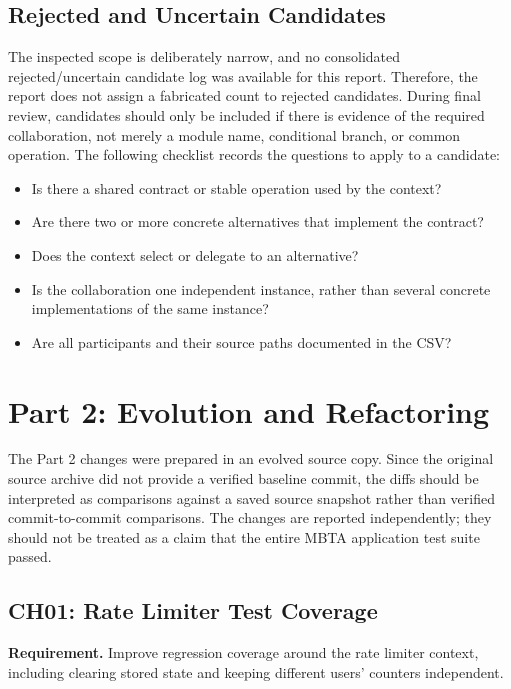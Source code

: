 \documentclass[11pt,a4paper]{article}
\begin{document}
\subsection{Rejected and Uncertain Candidates}
The inspected scope is deliberately narrow, and no consolidated rejected/uncertain candidate log was available for this report. Therefore, the report does not assign a fabricated count to rejected candidates. During final review, candidates should only be included if there is evidence of the required collaboration, not merely a module name, conditional branch, or common operation. The following checklist records the questions to apply to a candidate:
\begin{itemize}[leftmargin=*]
\item Is there a shared contract or stable operation used by the context?
\item Are there two or more concrete alternatives that implement the contract?
\item Does the context select or delegate to an alternative?
\item Is the collaboration one independent instance, rather than several concrete implementations of the same instance?
\item Are all participants and their source paths documented in the CSV?
\end{itemize}

\section{Part 2: Evolution and Refactoring}
The Part 2 changes were prepared in an evolved source copy. Since the original source archive did not provide a verified baseline commit, the diffs should be interpreted as comparisons against a saved source snapshot rather than verified commit-to-commit comparisons. The changes are reported independently; they should not be treated as a claim that the entire MBTA application test suite passed.

\subsection{CH01: Rate Limiter Test Coverage}
\textbf{Requirement.} Improve regression coverage around the rate limiter context, including clearing stored state and keeping different users' counters independent.
\end{document}
